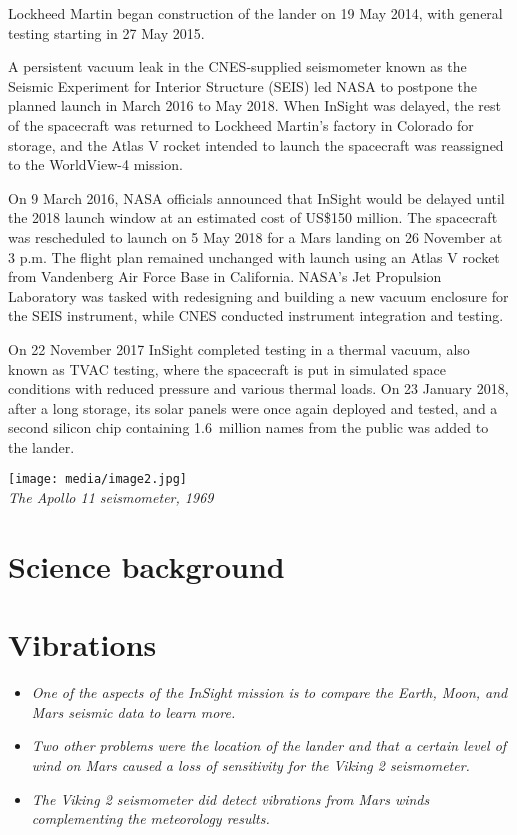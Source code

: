 Lockheed Martin began construction of the lander on 19 May 2014, with
general testing starting in 27 May 2015.

A persistent vacuum leak in the CNES-supplied seismometer known as the
Seismic Experiment for Interior Structure (SEIS) led NASA to postpone
the planned launch in March 2016 to May 2018. When InSight was delayed,
the rest of the spacecraft was returned to Lockheed Martin's factory in
Colorado for storage, and the Atlas V rocket intended to launch the
spacecraft was reassigned to the WorldView-4 mission.

On 9 March 2016, NASA officials announced that InSight would be delayed
until the 2018 launch window at an estimated cost of US\$150 million.
The spacecraft was rescheduled to launch on 5 May 2018 for a Mars
landing on 26 November at 3 p.m. The flight plan remained unchanged with
launch using an Atlas V rocket from Vandenberg Air Force Base in
California. NASA's Jet Propulsion Laboratory was tasked with redesigning
and building a new vacuum enclosure for the SEIS instrument, while CNES
conducted instrument integration and testing.

On 22 November 2017 InSight completed testing in a thermal vacuum, also
known as TVAC testing, where the spacecraft is put in simulated space
conditions with reduced pressure and various thermal loads. On 23
January 2018, after a long storage, its solar panels were once again
deployed and tested, and a second silicon chip containing 1.6~million
names from the public was added to the lander.

\texttt{[image: media/image2.jpg]}\\
\emph{The Apollo 11 seismometer, 1969}

\section{Science background}\label{science-background}

\section{Vibrations}\label{vibrations}

\begin{itemize}
\item
  \emph{One of the aspects of the InSight mission is to compare the
  Earth, Moon, and Mars seismic data to learn more.}
\item
  \emph{Two other problems were the location of the lander and that a
  certain level of wind on Mars caused a loss of sensitivity for the
  Viking 2 seismometer.}
\item
  \emph{The Viking 2 seismometer did detect vibrations from Mars winds
  complementing the meteorology results.}
\end{itemize}


